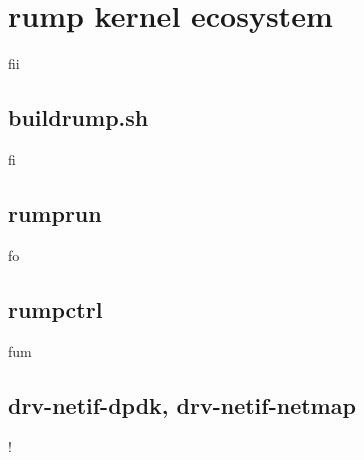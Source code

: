 \section{rump kernel ecosystem}

fii

\subsection{buildrump.sh}

fi

\subsection{rumprun}

fo

\subsection{rumpctrl}

fum

\subsection{drv-netif-dpdk, drv-netif-netmap}

!
